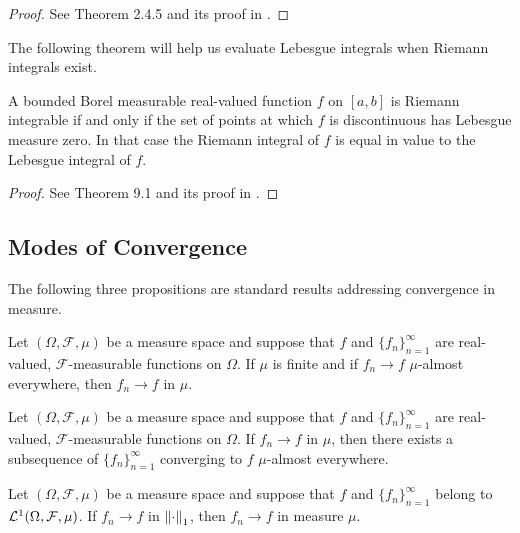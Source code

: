 \begin{proof}
See Theorem 2.4.5 and its proof in \cite{cohn_2013_measure}.
\end{proof}

The following theorem will help us evaluate Lebesgue integrals when Riemann integrals exist.
\begin{theorem}
A bounded Borel measurable real-valued function $f$ on $[a,b]$ is Riemann integrable if and only if the set of points at which $f$ is discontinuous has Lebesgue measure zero. In that case the Riemann integral of $f$ is equal in value to the Lebesgue integral of $f$.
\end{theorem}
\begin{proof}
See Theorem 9.1 and its proof in \cite{bass2011real}.
\end{proof}
\subsection{Modes of Convergence}
The following three propositions are standard results addressing convergence in measure.
\begin{proposition}
\label{proposition:measure:convergence:ae_implies_mu}
Let $(\Omega, \mathcal{F}, \mu)$ be a measure space and suppose that $f$ and $\{ f_n \}_{n=1}^\infty$ are real-valued, $\mathcal{F}$-measurable functions on $\Omega$. If $\mu$ is finite and if $f_n \to f$ $\mu$-almost everywhere, then $f_n \to f$ in $\mu$.
\end{proposition}

\begin{proposition}
\label{proposition:measure:convergence:mu_implies_subseqn_ae}
Let $(\Omega, \mathcal{F}, \mu)$ be a measure space and suppose that $f$ and $\{ f_n \}_{n=1}^\infty$ are real-valued, $\mathcal{F}$-measurable functions on $\Omega$. If $f_n \to f$ in $\mu$, then there exists a subsequence of $\{ f_n \}_{n = 1}^\infty$ converging to $f$ $\mu$-almost everywhere.
\end{proposition}
\begin{proposition}
\label{proposition:measure:convergence:lone_implies_ae}
Let $(\Omega, \mathcal{F}, \mu)$ be a measure space and suppose that $f$ and $\{ f_n \}_{n=1}^\infty$ belong to ${\mathcal {L}^1}(\Omega, \mathcal{F}, \mu)$. If $f_n \to f$ in $\left\lVert\cdot\right\rVert_1$, then  $f_n \to f$ in measure $\mu$.
\end{proposition}

